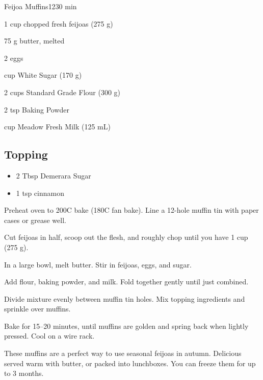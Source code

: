 \begin{recipebox}{Feijoa Muffins}{12}{30 min}
\begin{ingredients}
  \item 1 cup chopped fresh feijoas (275 g)
  \item 75 g butter, melted
  \item 2 eggs
  \item {} cup White Sugar (170 g)
  \item 2 cups Standard Grade Flour (300 g)
  \item 2 tsp Baking Powder
  \item {} cup Meadow Fresh Milk (125 mL)
\end{ingredients}

\subsection*{Topping}
\begin{itemize}[leftmargin=2em]
  \item 2 Tbsp Demerara Sugar
  \item 1 tsp cinnamon
\end{itemize}

\begin{method}
  \item Preheat oven to 200\degree C bake (180\degree C fan bake). Line a 12-hole muffin tin with paper cases or grease well.
  \item Cut feijoas in half, scoop out the flesh, and roughly chop until you have 1 cup (275 g).
  \item In a large bowl, melt butter. Stir in feijoas, eggs, and sugar.
  \item Add flour, baking powder, and milk. Fold together gently until just combined.
  \item Divide mixture evenly between muffin tin holes. Mix topping ingredients and sprinkle over muffins.
  \item Bake for 15–20 minutes, until muffins are golden and spring back when lightly pressed. Cool on a wire rack.
\end{method}

\begin{notes}
These muffins are a perfect way to use seasonal feijoas in autumn.  
Delicious served warm with butter, or packed into lunchboxes.  
You can freeze them for up to 3 months.  
\end{notes}
\end{recipebox}

